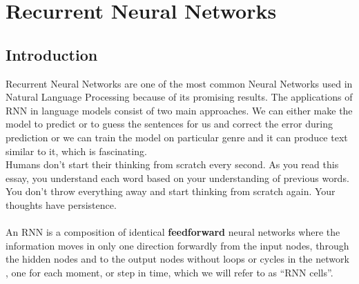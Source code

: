 \section{Recurrent Neural Networks}
\label{chap:Recurrent Neural Networks}

\subsection{Introduction}
 Recurrent Neural Networks are one of the most common Neural Networks used in Natural Language Processing because of its promising results. The applications of RNN in language models consist of two main approaches. We can either make the model to predict or to guess the sentences for us and correct the error during prediction or we can train the model on particular genre and it can produce text similar to it, which is fascinating.\cite{web024}\\
\indent Humans don’t start their thinking from scratch every second. As you read this essay, you understand each word based on your understanding of previous words. You don’t throw everything away and start thinking from scratch again. Your thoughts have persistence.\cite{web023}\\\\
\indent An RNN is a composition of identical \textbf{feedforward} neural networks where the information moves in only one direction forwardly from the input
nodes, through the hidden nodes and to the output nodes without loops or cycles in the
network
, one for each moment, or step in time, which we will refer to as “RNN cells”.
